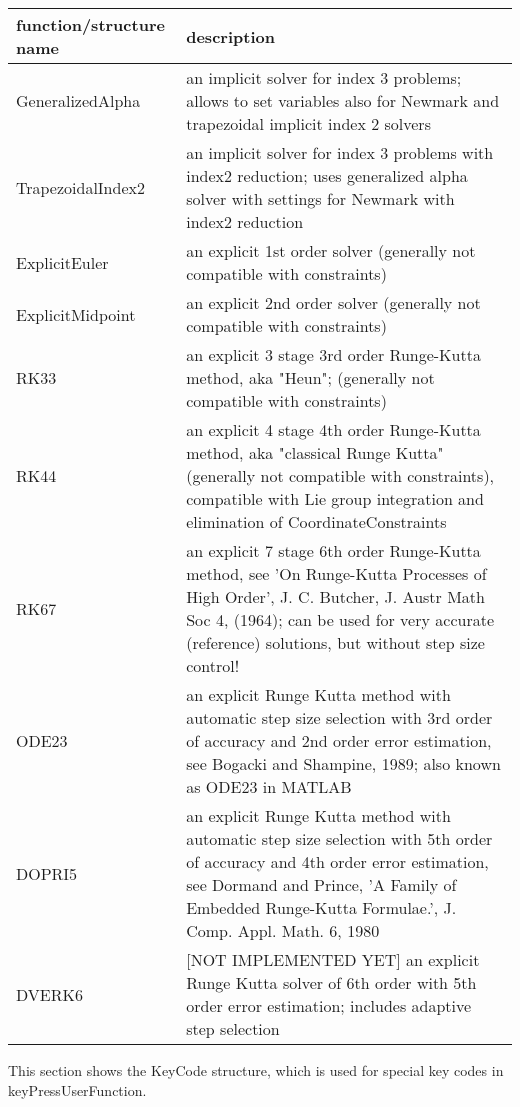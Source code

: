\begin{center}
\footnotesize
\begin{longtable}{| p{8cm} | p{8cm} |} 
\hline
{\bf function/structure name} & {\bf description}\\ \hline
  GeneralizedAlpha & an implicit solver for index 3 problems; allows to set variables also for Newmark and trapezoidal implicit index 2 solvers\\ \hline 
  TrapezoidalIndex2 & an implicit solver for index 3 problems with index2 reduction; uses generalized alpha solver with settings for Newmark with index2 reduction\\ \hline 
  ExplicitEuler & an explicit 1st order solver (generally not compatible with constraints)\\ \hline 
  ExplicitMidpoint & an explicit 2nd order solver (generally not compatible with constraints)\\ \hline 
  RK33 & an explicit 3 stage 3rd order Runge-Kutta method, aka "Heun"; (generally not compatible with constraints)\\ \hline 
  RK44 & an explicit 4 stage 4th order Runge-Kutta method, aka "classical Runge Kutta" (generally not compatible with constraints), compatible with Lie group integration and elimination of CoordinateConstraints\\ \hline 
  RK67 & an explicit 7 stage 6th order Runge-Kutta method, see 'On Runge-Kutta Processes of High Order', J. C. Butcher, J. Austr Math Soc 4, (1964); can be used for very accurate (reference) solutions, but without step size control!\\ \hline 
  ODE23 & an explicit Runge Kutta method with automatic step size selection with 3rd order of accuracy and 2nd order error estimation, see Bogacki and Shampine, 1989; also known as ODE23 in MATLAB\\ \hline 
  DOPRI5 & an explicit Runge Kutta method with automatic step size selection with 5th order of accuracy and 4th order error estimation, see  Dormand and Prince, 'A Family of Embedded Runge-Kutta Formulae.', J. Comp. Appl. Math. 6, 1980\\ \hline 
  DVERK6 & [NOT IMPLEMENTED YET] an explicit Runge Kutta solver of 6th order with 5th order error estimation; includes adaptive step selection\\ \hline 
\end{longtable}
\end{center}

\label{sec:KeyCode}
This section shows the KeyCode structure, which is used for special key codes in keyPressUserFunction.




